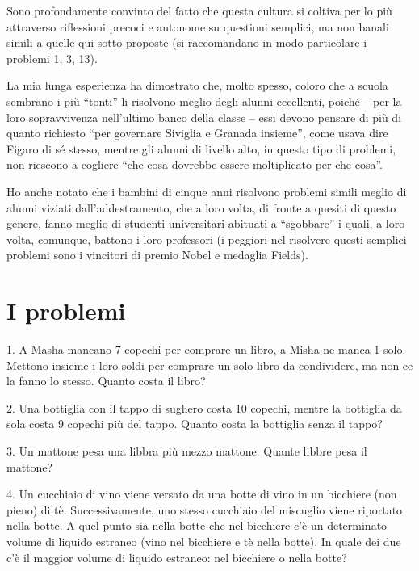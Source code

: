 Sono profondamente convinto del fatto che questa cultura si coltiva per lo più attraverso riflessioni precoci e autonome su questioni semplici, ma non banali simili a quelle qui sotto proposte (si raccomandano in modo particolare i problemi 1, 3, 13).

La mia lunga esperienza ha dimostrato che, molto spesso, coloro che a scuola sembrano i più \enquote{tonti} li risolvono meglio degli alunni eccellenti, poiché
 -- per la loro sopravvivenza nell’ultimo banco della classe -- essi devono pensare di più di quanto richiesto \enquote{per governare Siviglia e Granada insieme}, come usava dire Figaro di sé stesso, mentre gli alunni di livello alto, in questo tipo di problemi, non riescono a cogliere \enquote{che cosa dovrebbe essere moltiplicato per che cosa}.

Ho anche notato che i bambini di cinque anni risolvono problemi simili meglio di alunni viziati dall’addestramento, che a loro volta, di fronte a quesiti di questo genere, fanno meglio di studenti universitari abituati a \enquote{sgobbare} i quali, a loro volta, comunque, battono i loro professori (i peggiori nel risolvere questi semplici problemi sono i vincitori di premio Nobel e medaglia Fields).

\clearpage
\section*{I problemi}

\begin{problem}{1.}
	A Masha mancano 7 copechi per comprare un libro, a Misha ne manca 1 solo. Mettono insieme i loro soldi per comprare un solo libro da condividere, ma non ce la fanno lo stesso. Quanto costa il libro?
\end{problem}

\begin{problem}{2.}
	Una bottiglia con il tappo di sughero costa 10 copechi, mentre la bottiglia da sola costa 9 copechi più del tappo. Quanto costa la bottiglia senza il tappo?
\end{problem}

\begin{problem}{3.}
	Un mattone pesa una libbra più mezzo mattone. Quante libbre pesa il mattone?
\end{problem}

\begin{problem}{4.}
	Un cucchiaio di vino viene versato da una botte di vino in un bicchiere (non pieno) di tè. Successivamente, uno stesso cucchiaio del miscuglio viene riportato nella botte. A quel punto sia nella botte che nel bicchiere c’è un determinato volume di liquido estraneo (vino nel bicchiere e tè nella botte). In quale dei due c’è il maggior volume di liquido estraneo: nel bicchiere o nella botte?
\end{problem}

